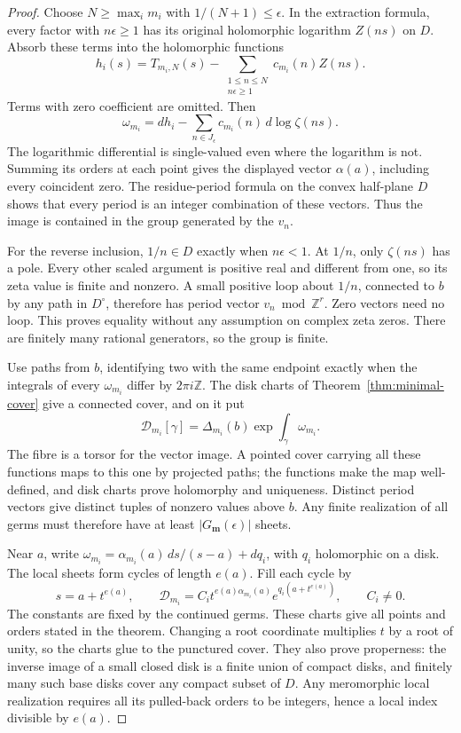 \begin{proof}
Choose \(N\geq\max_i m_i\) with \(1/(N+1)\leq\epsilon\).
In the extraction formula, every factor with \(n\epsilon\geq1\)
has its original holomorphic logarithm \(Z(ns)\) on \(D\).
Absorb these terms into the holomorphic functions
\[
 h_i(s)=T_{m_i,N}(s)
       -\sum_{\substack{1\leq n\leq N\\n\epsilon\geq1}}
          c_{m_i}(n)Z(ns).
\]
Terms with zero coefficient are omitted.  Then
\[
 \omega_{m_i}=dh_i-
       \sum_{n\in J_\epsilon}c_{m_i}(n)\,d\log\zeta(ns).
\]
The logarithmic differential is single-valued even where the logarithm
is not.  Summing its orders at each point gives the displayed vector
\(\alpha(a)\), including every coincident zero.  The residue-period
formula on the convex half-plane \(D\) shows that every period is an
integer combination of these vectors.  Thus the image is contained in
the group generated by the \(v_n\).

For the reverse inclusion, \(1/n\in D\) exactly when
\(n\epsilon<1\).  At \(1/n\), only \(\zeta(ns)\) has a pole.
Every other scaled argument is positive real and different from one,
so its zeta value is finite and nonzero.  A small positive loop about
\(1/n\), connected to \(b\) by any path in \(D^\circ\), therefore
has period vector \(v_n\bmod\mathbb Z^r\).  Zero vectors need no
loop.  This proves equality without any assumption on complex zeta zeros.
There are finitely many rational generators, so the group is finite.

Use paths from \(b\), identifying two with the same endpoint exactly
when the integrals of every \(\omega_{m_i}\) differ by
\(2\pi i\mathbb Z\).  The disk charts of
Theorem~\ref{thm:minimal-cover} give a connected cover, and on it put
\[
 \mathcal D_{m_i}[\gamma]
 =\Delta_{m_i}(b)\exp\int_\gamma\omega_{m_i}.
\]
The fibre is a torsor for the vector image.  A pointed cover carrying
all these functions maps to this one by projected paths; the functions
make the map well-defined, and disk charts prove holomorphy and uniqueness.
Distinct period vectors give distinct tuples of nonzero values above
\(b\).  Any finite realization of all germs must therefore have at
least \(|G_{\mathbf m}(\epsilon)|\) sheets.

Near \(a\), write
\(\omega_{m_i}=\alpha_{m_i}(a)\,ds/(s-a)+dq_i\), with \(q_i\)
holomorphic on a disk.  The local sheets form cycles of length \(e(a)\).
Fill each cycle by
\[
 s=a+t^{e(a)},\qquad
 \mathcal D_{m_i}=C_i t^{e(a)\alpha_{m_i}(a)}
                    e^{q_i(a+t^{e(a)})},\qquad C_i\ne0.
\]
The constants are fixed by the continued germs.  These charts give all
points and orders stated in the theorem.  Changing a root coordinate
multiplies \(t\) by a root of unity, so the charts glue to the
punctured cover.  They also prove properness: the inverse image of a small
closed disk is a finite union of compact disks, and finitely many such
base disks cover any compact subset of \(D\).
Any meromorphic local realization requires all its pulled-back orders
to be integers, hence a local index divisible by \(e(a)\).


\end{proof}
